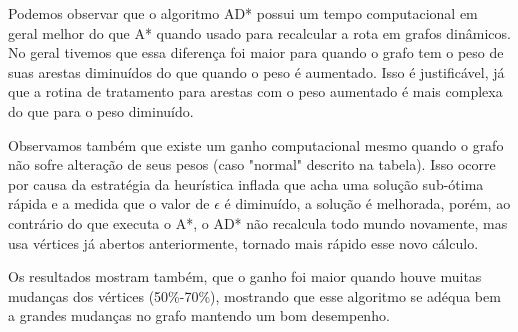 Podemos observar que o algoritmo AD* possui um tempo computacional em geral melhor do que A* quando usado para recalcular a rota em grafos dinâmicos. No geral tivemos que essa diferença foi maior para quando o grafo tem o peso de suas arestas diminuídos do que quando o peso é aumentado. Isso é justificável, já que a rotina de tratamento para arestas com o peso aumentado é mais complexa do que para o peso diminuído.

Observamos também que existe um ganho computacional mesmo quando o grafo não sofre alteração de seus pesos (caso "normal" descrito na tabela). Isso ocorre por causa da estratégia da heurística inflada que acha uma solução sub-ótima rápida e a medida que  o valor de $\epsilon$ é diminuído, a solução é melhorada, porém, ao contrário do que executa o A*, o AD* não recalcula todo mundo novamente, mas usa vértices já abertos anteriormente, tornado mais rápido esse novo cálculo.

Os resultados mostram também, que o ganho foi maior quando houve muitas mudanças dos vértices (50\%-70\%), mostrando que esse algoritmo se adéqua bem a grandes mudanças no grafo mantendo um bom desempenho.